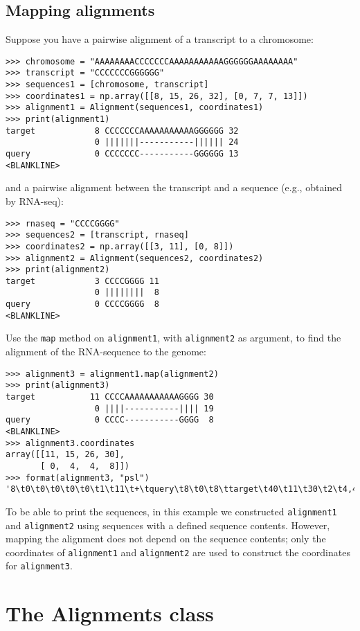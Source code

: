 \subsection{Mapping alignments}

Suppose you have a pairwise alignment of a transcript to a chromosome:
\begin{verbatim}
>>> chromosome = "AAAAAAAACCCCCCCAAAAAAAAAAAGGGGGGAAAAAAAA"
>>> transcript = "CCCCCCCGGGGGG"
>>> sequences1 = [chromosome, transcript]
>>> coordinates1 = np.array([[8, 15, 26, 32], [0, 7, 7, 13]])
>>> alignment1 = Alignment(sequences1, coordinates1)
>>> print(alignment1)
target            8 CCCCCCCAAAAAAAAAAAGGGGGG 32
                  0 |||||||-----------|||||| 24
query             0 CCCCCCC-----------GGGGGG 13
<BLANKLINE>
\end{verbatim}
and a pairwise alignment between the transcript and a sequence (e.g., obtained by RNA-seq):
\begin{verbatim}
>>> rnaseq = "CCCCGGGG"
>>> sequences2 = [transcript, rnaseq]
>>> coordinates2 = np.array([[3, 11], [0, 8]])
>>> alignment2 = Alignment(sequences2, coordinates2)
>>> print(alignment2)
target            3 CCCCGGGG 11
                  0 ||||||||  8
query             0 CCCCGGGG  8
<BLANKLINE>
\end{verbatim}
Use the \verb|map| method on \verb|alignment1|, with \verb|alignment2| as argument, to find the alignment of the RNA-sequence to the genome:
\begin{verbatim}
>>> alignment3 = alignment1.map(alignment2)
>>> print(alignment3)
target           11 CCCCAAAAAAAAAAAGGGG 30
                  0 ||||-----------|||| 19
query             0 CCCC-----------GGGG  8
<BLANKLINE>
>>> alignment3.coordinates
array([[11, 15, 26, 30],
       [ 0,  4,  4,  8]])
>>> format(alignment3, "psl")
'8\t0\t0\t0\t0\t0\t1\t11\t+\tquery\t8\t0\t8\ttarget\t40\t11\t30\t2\t4,4,\t0,4,\t11,26,\n'
\end{verbatim}
To be able to print the sequences, in this example  we constructed \verb|alignment1| and \verb|alignment2| using sequences with a defined sequence contents.
However, mapping the alignment does not depend on the sequence contents; only the coordinates of \verb|alignment1| and \verb|alignment2| are used to construct the coordinates for \verb|alignment3|.


\section{The Alignments class}
\label{sec:alignments}

